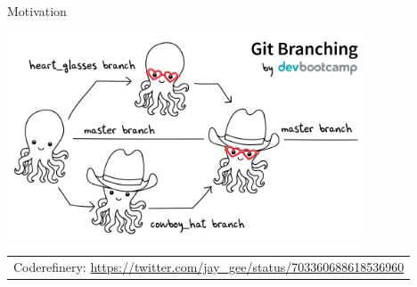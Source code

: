 \begin{frame}{Motivation}

\begin{center}
  \includegraphics[width=0.8\textwidth]{../01_basics/pics/merging_pic.jpg}
\end{center}



\tiny
\begin{tabular}{l}
Coderefinery: \url{https://twitter.com/jay_gee/status/703360688618536960}
\end{tabular}

\end{frame}
